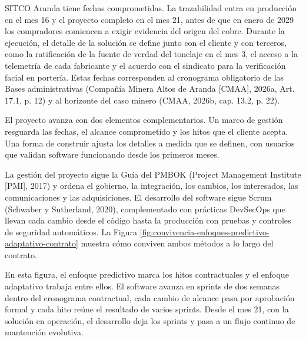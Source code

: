 \documentclass[subdoc]{../../comun/overfore}
\begin{document}
SITCO Aranda tiene fechas comprometidas. La trazabilidad entra en producción en el mes 16 y el proyecto completo en el mes 21, antes de que en enero de 2029 los compradores comiencen a exigir evidencia del origen del cobre. Durante la ejecución, el detalle de la solución se define junto con el cliente y con terceros, como la ratificación de la fuente de verdad del tonelaje en el mes 3, el acceso a la telemetría de cada fabricante y el acuerdo con el sindicato para la verificación facial en portería. Estas fechas corresponden al cronograma obligatorio de las Bases administrativas (Compañía Minera Altos de Aranda [CMAA], 2026a, Art. 17.1, p. 12) y al horizonte del caso minero (CMAA, 2026b, cap. 13.2, p. 22).

El proyecto avanza con dos elementos complementarios. Un marco de gestión resguarda las fechas, el alcance comprometido y los hitos que el cliente acepta. Una forma de construir ajusta los detalles a medida que se definen, con usuarios que validan software funcionando desde los primeros meses.

La gestión del proyecto sigue la Guía del PMBOK (Project Management Institute [PMI], 2017) y ordena el gobierno, la integración, los cambios, los interesados, las comunicaciones y las adquisiciones. El desarrollo del software sigue Scrum (Schwaber y Sutherland, 2020), complementado con prácticas DevSecOps que llevan cada cambio desde el código hasta la producción con pruebas y controles de seguridad automáticos. La Figura \ref{fig:convivencia-enfoques-predictivo-adaptativo-contrato} muestra cómo conviven ambos métodos a lo largo del contrato.

En esta figura, el enfoque predictivo marca los hitos contractuales y el enfoque adaptativo trabaja entre ellos. El software avanza en sprints de dos semanas dentro del cronograma contractual, cada cambio de alcance pasa por aprobación formal y cada hito reúne el resultado de varios sprints. Desde el mes 21, con la solución en operación, el desarrollo deja los sprints y pasa a un flujo continuo de mantención evolutiva.
\end{document}
